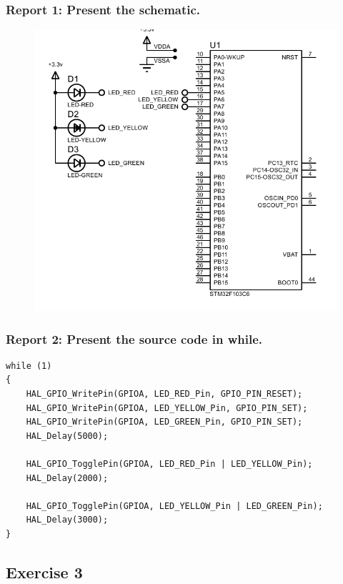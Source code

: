 \documentclass[a4paper,12pt]{article}
\begin{document}
\subsubsection{Report 1: Present the schematic.}
\label{ex2r1}
\begin{figure}[H]
	\centering
	\includegraphics[width=0.95\linewidth]{Attachments/1.2.1.PDF}
\end{figure}
\subsubsection{Report 2: Present the source code in while.}
\begin{lstlisting}
while (1)
{
	HAL_GPIO_WritePin(GPIOA, LED_RED_Pin, GPIO_PIN_RESET);
	HAL_GPIO_WritePin(GPIOA, LED_YELLOW_Pin, GPIO_PIN_SET);
	HAL_GPIO_WritePin(GPIOA, LED_GREEN_Pin, GPIO_PIN_SET);
	HAL_Delay(5000);
	
	HAL_GPIO_TogglePin(GPIOA, LED_RED_Pin | LED_YELLOW_Pin);
	HAL_Delay(2000);
	
	HAL_GPIO_TogglePin(GPIOA, LED_YELLOW_Pin | LED_GREEN_Pin);
	HAL_Delay(3000);
}
\end{lstlisting}
\newpage
\subsection{Exercise 3}
\end{document}

